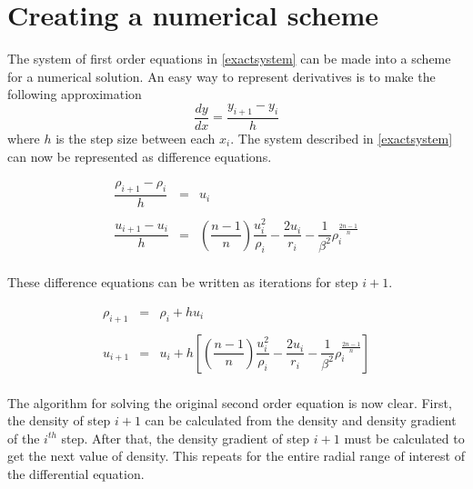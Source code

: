 \documentclass[11pt,letterpaper]{article}
\begin{document}
\section{Creating a numerical scheme}

The system of first order equations in \eqref{exactsystem} can be made into a
scheme for a numerical solution. An easy way to represent derivatives is to
make the following approximation
\begin{displaymath}
    \frac{dy}{dx} = \frac{y_{i+1} - y_i}{h}
\end{displaymath}
where $h$ is the step size between each $x_i$. The system described in
\eqref{exactsystem} can now be represented as difference equations.

\begin{equation}
    \begin{array}{rcl}
        \dfrac{\rho_{i+1} - \rho_i}{h} & = & u_i\\
        \ \\
        \dfrac{u_{i+1} - u_i}{h} & = &
        \left(\dfrac{n-1}{n}\right)\dfrac{u_i^2}{\rho_i}
        -\dfrac{2 u_i}{r_i} -\dfrac{1}{\beta^2} \rho_i^\frac{2n-1}{n} \\
    \end{array}
    \label{difference_eq}
\end{equation}

These difference equations can be written as iterations for step $i+1$.

\begin{equation}
    \begin{array}{rcl}
        \rho_{i+1} & = & \rho_i + h u_i\\
        \ \\
        u_{i+1} & = &
        u_i + h\left[\left(\dfrac{n-1}{n}\right)\dfrac{u_i^2}{\rho_i}
        -\dfrac{2 u_i}{r_i} -\dfrac{1}{\beta^2} \rho_i^\frac{2n-1}{n}\right]\\
    \end{array}
    \label{iteration_eq}
\end{equation}

The algorithm for solving the original second order equation is now clear.
First, the density of step $i+1$ can be calculated from the density and density
gradient of the $i^{th}$ step. After that, the density gradient of step $i+1$
must be calculated to get the next value of density. This repeats for the entire
radial range of interest of the differential equation.\\
\end{document}
